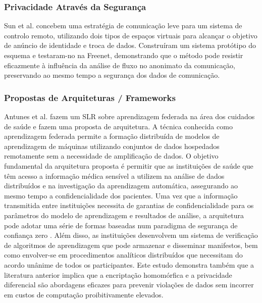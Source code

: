 \documentclass[conference]{IEEEtran}
\begin{document}
\subsubsection{Privacidade Através da Segurança}

Sun et al. \cite{SunSecure} concebem uma estratégia de comunicação leve para
um sistema de controlo remoto, utilizando dois tipos de espaços virtuais para
alcançar o objetivo de anúncio de identidade e troca de dados. Construíram
um sistema protótipo do esquema e testaram-no na Freenet, demonstrando que
o método pode resistir eficazmente à influência da análise de fluxo no anonimato
da comunicação, preservando ao mesmo tempo a segurança dos dados de comunicação.


\subsubsection{Propostas de Arquiteturas / Frameworks}

Antunes et al. \cite{AntunesFederated} fazem um SLR sobre aprendizagem federada
na área dos cuidados de saúde e fazem uma proposta de arquitetura. A técnica
conhecida como aprendizagem federada permite a formação distribuída de modelos
de aprendizagem de máquinas utilizando conjuntos de dados hospedados remotamente
sem a necessidade de amplificação de dados. O objetivo fundamental da arquitetura
proposta é permitir que as instituições de saúde que têm acesso a informação
médica sensível a utilizem na análise de dados distribuídos e na investigação
da aprendizagem automática, assegurando ao mesmo tempo a confidencialidade dos
pacientes. Uma vez que a informação transmitida entre instituições necessita
de garantias de confidencialidade para os parâmetros do modelo de aprendizagem
e resultados de análise, a arquitetura pode adotar uma série de formas baseadas
num paradigma de segurança de confiança zero \cite{ChenSecurity}. Além disso,
as instituições desenvolvem um sistema de verificação de algoritmos de aprendizagem
que pode armazenar e disseminar manifestos, bem como envolver-se em procedimentos
analíticos distribuídos que necessitam do acordo unânime de todos os participantes.
Este estudo demonstra também que a literatura anterior implica que a encriptação
homomórfica e a privacidade diferencial são abordagens eficazes para prevenir
violações de dados sem incorrer em custos de computação proibitivamente elevados.
\end{document}
